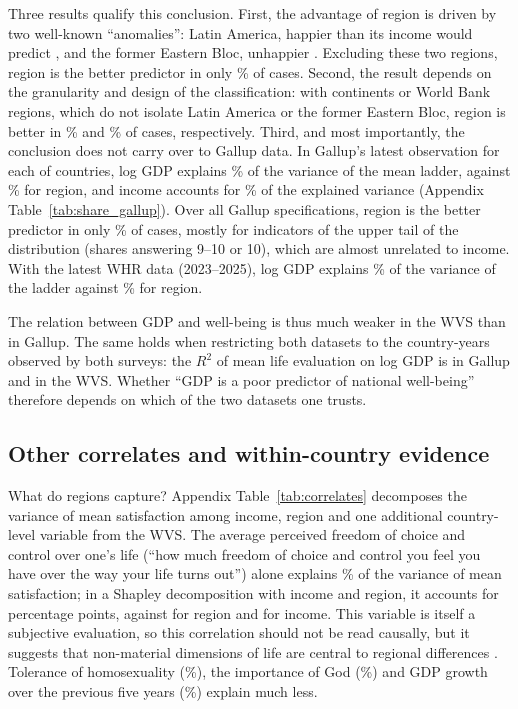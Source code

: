 Three results qualify this conclusion. First, the advantage of region is driven by two well-known ``anomalies'': Latin America, happier than its income would predict \citep{graham_paradox_2009,rojas_handbook_2016}, and the former Eastern Bloc, unhappier \citep{guriev_unhappiness_2009}. Excluding these two regions, region is the better predictor in only \shareRegionBetterNoLatamEE\% of cases. Second, the result depends on the granularity and design of the classification: with continents or World Bank regions, which do not isolate Latin America or the former Eastern Bloc, region is better in \shareRegionBetterContinents\% and \shareRegionBetterWB\% of cases, respectively. Third, and most importantly, the conclusion does not carry over to Gallup data. In Gallup's latest observation for each of \nGallupCountries countries, log GDP explains \RtwoGallupMeanPPP\% of the variance of the mean ladder, against \RtwoGallupRegion\% for region, and income accounts for \shareIncomeGallupMean\% of the explained variance (Appendix Table~\ref{tab:share_gallup}). Over all Gallup specifications, region is the better predictor in only \shareRegionBetterGallup\% of cases, mostly for indicators of the upper tail of the distribution (shares answering 9--10 or 10), which are almost unrelated to income. With the latest WHR data (2023--2025), log GDP explains \RtwoWHRPPP\% of the variance of the ladder against \RtwoWHRRegion\% for region.

The relation between GDP and well-being is thus much weaker in the WVS than in Gallup. The same holds when restricting both datasets to the \nCommon country-years observed by both surveys: the $R^2$ of mean life evaluation on log GDP is \RtwoCommonGallup in Gallup and \RtwoCommonWVS in the WVS. Whether ``GDP is a poor predictor of national well-being'' therefore depends on which of the two datasets one trusts.

\subsection{Other correlates and within-country evidence}\label{subsec:correlates}

What do regions capture? Appendix Table~\ref{tab:correlates} decomposes the variance of mean satisfaction among income, region and one additional country-level variable from the WVS. The average perceived freedom of choice and control over one's life (``how much freedom of choice and control you feel you have over the way your life turns out'') alone explains \RtwoFreedomSatisfaction\% of the variance of mean satisfaction; in a Shapley decomposition with income and region, it accounts for \shapleyFreedom percentage points, against \shapleyFreedomRegion for region and \shapleyFreedomIncome for income. This variable is itself a subjective evaluation, so this correlation should not be read causally, but it suggests that non-material dimensions of life are central to regional differences \citep{inglehart_development_2008}. Tolerance of homosexuality (\RtwoTolerance\%), the importance of God (\RtwoGod\%) and GDP growth over the previous five years (\RtwoGrowth\%) explain much less.

